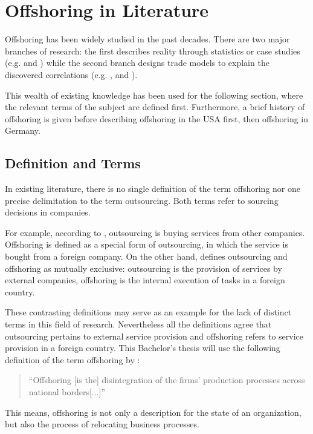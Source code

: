 \section{Offshoring in Literature}
\label{sec:Theory}
Offshoring has been widely studied in the past decades. There are two major branches of research: the first describes reality through statistics or case studies (e.g. \cite{Rottman.2008} and \cite{Pedersen.2013}) while the second branch designs trade models to explain the discovered correlations (e.g. \cite{Antras.2004}, \cite{Grossman.2008} and \cite{Helpman.1999}).

This wealth of existing knowledge has been used for the following section, where the relevant terms of the subject are defined first. Furthermore, a brief history of offshoring is given before describing offshoring in the USA first, then offshoring in Germany.

\subsection{Definition and Terms}
In existing literature, there is no single definition of the term offshoring nor one precise delimitation to the term outsourcing. Both terms refer to sourcing decisions in companies. 

For example, according to \cite[pp. 1f]{Knolmayer.2007}, outsourcing is buying services from other companies. Offshoring is defined as a special form of outsourcing, in which the service is bought from a foreign company. On the other hand, \cite[p. 2]{Alebrand.2013} defines outsourcing and offshoring as mutually exclusive: outsourcing is the provision of services by external companies, offshoring is the internal execution of tasks in a foreign country.

These contrasting definitions may serve as an example for the lack of distinct terms in this field of research. Nevertheless all the definitions agree that outsourcing pertains to external service provision and offshoring refers to service provision in a foreign country. This Bachelor's thesis will use the following definition of the term offshoring by \cite[p. 321]{Andersson.2016}:

\begin{quote}
	``Offshoring [is the] disintegration of the firms’ production processes across national borders[...]''
\end{quote} 

This means, offshoring is not only a description for the state of an organization, but also the process of relocating business processes.

